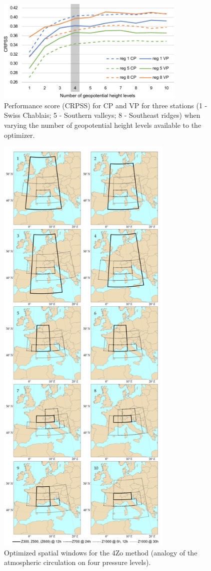 \documentclass[review]{elsarticle}
\begin{document}
\begin{figure}[t]
	\centerline{\includegraphics[width=9cm]{figures/fig02.pdf}}
	\caption{Performance score (CRPSS) for CP and VP for three stations (1 - Swiss Chablais; 5 - Southern valleys; 8 - Southeast ridges) when varying the number of geopotential height levels available to the optimizer.}
	\label{fig:figure_nb_levels}
\end{figure}

\begin{figure}[t]
	\centerline{\includegraphics[width=8.4cm]{figures/fig03.pdf}}
	\caption{Optimized spatial windows for the 4Zo method (analogy of the atmospheric circulation on four pressure levels).}
	\label{fig:spatial_windows_4Zo}
\end{figure}
\end{document}
